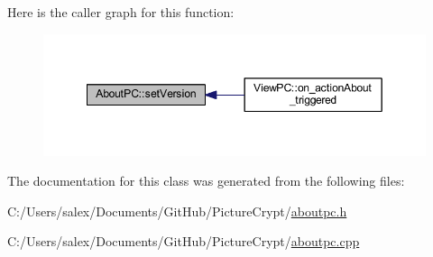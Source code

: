 Here is the caller graph for this function\+:
\nopagebreak
\begin{figure}[H]
\begin{center}
\leavevmode
\includegraphics[width=349pt]{class_about_p_c_aa3815d4826d0c8d87122449537a0a4d5_icgraph}
\end{center}
\end{figure}


The documentation for this class was generated from the following files\+:\begin{DoxyCompactItemize}
\item 
C\+:/\+Users/salex/\+Documents/\+Git\+Hub/\+Picture\+Crypt/\mbox{\hyperlink{aboutpc_8h}{aboutpc.\+h}}\item 
C\+:/\+Users/salex/\+Documents/\+Git\+Hub/\+Picture\+Crypt/\mbox{\hyperlink{aboutpc_8cpp}{aboutpc.\+cpp}}\end{DoxyCompactItemize}
